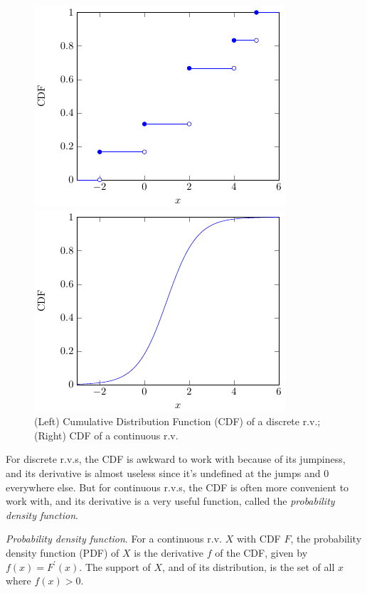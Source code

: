 \begin{figure}[h!]
\centering
\begin{minipage}{.5\textwidth}
  \centering
  \includegraphics{tikz/figure1}
\end{minipage}%
\begin{minipage}{.5\textwidth}
  \centering
  \includegraphics{tikz/figure2}
\end{minipage}
\caption{%
(Left) Cumulative Distribution Function (CDF) of a discrete r.v.; 
(Right) CDF of a continuous r.v.}
\end{figure}

For discrete r.v.s, 
the CDF is awkward to work with because of its jumpiness, 
and its derivative is almost useless since it's undefined at 
the jumps and 0 everywhere else. 
But for continuous r.v.s, 
the CDF is often more convenient to work with, 
and its derivative is a very useful function, 
called the \emph{probability density function}.

\emph{Probability density function}. 
For a continuous r.v. \(X\) with CDF \(F\), 
the probability density function (PDF) of \(X\) is the derivative \(f\) of the CDF, 
given by \(f(x) = F^{\prime}(x)\). 
The support of \(X\), and of its distribution, 
is the set of all \(x\) where
\(f(x) > 0\).

